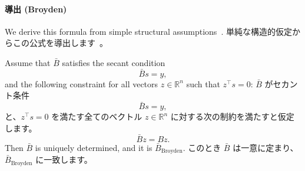 \documentclass[0_main]{subfiles}
\begin{document}
    \paragraph{導出 (Broyden)}
\fi

\ifEn
    We derive this formula from simple structural assumptions~\citep[Section 4]{dennisjrQuasiNewtonMethodsMotivation1977}.
\else
    単純な構造的仮定からこの公式を導出します~\citep[Section 4]{dennisjrQuasiNewtonMethodsMotivation1977}。
\fi
\begin{proposition}
    \ifEn
        Assume that $\bar{B}$ satisfies the secant condition
        \begin{equation*}
            \bar{B}s = y,
        \end{equation*}
        and the following constraint for all vectors $z \in \mathbb{R}^n$ such that $z^\top s = 0$:
    \else
        $\bar{B}$ がセカント条件
        \begin{equation*}
            \bar{B}s = y,
        \end{equation*}
        と、$z^\top s = 0$ を満たす全てのベクトル $z \in \mathbb{R}^n$ に対する次の制約を満たすと仮定します。
    \fi
    \begin{equation*}
        \bar{B}z = Bz.
    \end{equation*}
    \ifEn
        Then $\bar{B}$ is uniquely determined, and it is $\bar{B}_{\mathrm{Broyden}}$.
    \else
        このとき $\bar{B}$ は一意に定まり、$\bar{B}_{\mathrm{Broyden}}$ に一致します。
    \fi
\end{proposition}
\end{document}
